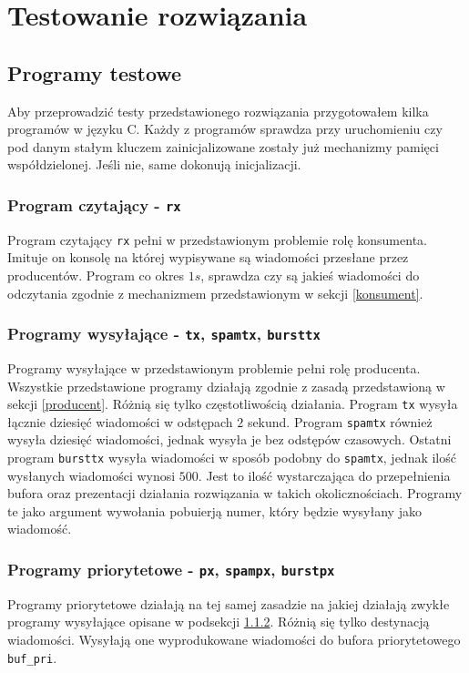 \documentclass{mwrep}
\begin{document}
\chapter{Testowanie rozwiązania}

\section{Programy testowe}
Aby przeprowadzić testy przedstawionego rozwiązania przygotowałem kilka programów w języku C.
Każdy z programów sprawdza przy uruchomieniu czy pod danym stałym kluczem zainicjalizowane zostały już
mechanizmy pamięci współdzielonej. Jeśli nie, same dokonują inicjalizacji.

\subsection{Program czytający - \texttt{rx}}
Program czytający \texttt{rx} pełni w przedstawionym problemie rolę konsumenta. Imituje on
konsolę na której wypisywane są wiadomości przesłane przez producentów. Program co okres $1s$, sprawdza
czy są jakieś wiadomości do odczytania zgodnie z mechanizmem przedstawionym w sekcji \ref{konsument}.

\subsection{Programy wysyłające - \texttt{tx}, \texttt{spamtx}, \texttt{bursttx}}
\label{tx}
Programy wysyłające w przedstawionym problemie pełni rolę producenta. Wszystkie przedstawione programy
działają zgodnie z zasadą przedstawioną w sekcji \ref{producent}. Różnią się tylko częstotliwością działania.
Program \texttt{tx} wysyła łącznie dziesięć wiadomości w odstępach $2$ sekund. Program \texttt{spamtx}
również wysyła dziesięć wiadomości, jednak wysyła je bez odstępów czasowych. Ostatni program \texttt{bursttx} wysyła
wiadomości w sposób podobny do \texttt{spamtx}, jednak ilość wysłanych wiadomości wynosi $500$. Jest to ilość wystarczająca
do przepełnienia bufora oraz prezentacji działania rozwiązania w takich okolicznościach. Programy te jako argument wywołania pobuierją numer,
który będzie wysyłany jako wiadomość.

\subsection{Programy priorytetowe - \texttt{px}, \texttt{spampx}, \texttt{burstpx}}
Programy priorytetowe działają na tej samej zasadzie na jakiej działają zwykłe programy wysyłające opisane
w podsekcji \ref{tx}. Różnią się tylko destynacją wiadomości. Wysyłają one wyprodukowane
wiadomości do bufora priorytetowego \texttt{buf\_pri}.
\end{document}
